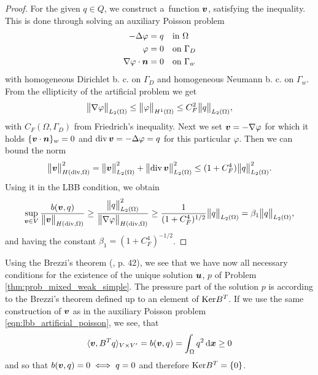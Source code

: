 \begin{proof}
For the given $q\in Q$, we construct a~function $\mathbf{\boldsymbol{v}}$, satisfying the inequality.
This is done through solving an auxiliary Poisson problem
\begin{equation} \label{eqn:lbb_artificial_poisson}  
\begin{aligned}
    -\Delta\varphi &= q && \textrm{in } \Omega\\
    \varphi &= 0 && \textrm{on } \Gamma_D \\
    \nabla\varphi\cdot\mathbf{\boldsymbol{n}} &= 0 && \textrm{on } \Gamma_w
\end{aligned}
\end{equation}
with homogeneous Dirichlet b. c. on $\Gamma_D$ and homogeneous Neumann b. c. on $\Gamma_w$.
From the ellipticity of the artificial problem we get
\begin{equation}
    \bigl\Vert\nabla\varphi\bigr\Vert_{L_2(\Omega)} \leq \bigl\Vert\varphi\bigr\Vert_{H^1(\Omega)}
        \leq C_F^2 \bigl\Vert q\bigr\Vert_{L_2(\Omega)},
\end{equation}
with $C_F(\Omega,\Gamma_D)$ from Friedrich's inequality.
Next we set $\mathbf{\boldsymbol{v}} = -\nabla \varphi$ for which it holds $\{\mathbf{\boldsymbol{v}}\cdot\mathbf{\boldsymbol{n}}\}_w=0$
and ${\rm div}\,\mathbf{\boldsymbol{v}} = -\Delta\varphi=q$ for this particular $\varphi$. Then we can bound the norm
\begin{equation}
    \bigl\Vert\mathbf{\boldsymbol{v}}\bigr\Vert^2_{H({\rm div},\Omega)} = \bigl\Vert\mathbf{\boldsymbol{v}}\bigr\Vert^2_{L_2(\Omega)} 
        + \bigl\Vert{\rm div}\,\mathbf{\boldsymbol{v}}\bigr\Vert^2_{L_2(\Omega)}
        \leq (1+C_F^4) \bigl\Vert q\bigr\Vert^2_{L_2(\Omega)}.
\end{equation}
Using it in the LBB condition, we obtain
\begin{equation} \label{eqn:form_b_lbb_proof}
    \sup_{\mathbf{\boldsymbol{v}}\in V} \frac{b(\mathbf{\boldsymbol{v}},q)}{\bigl\Vert\mathbf{\boldsymbol{v}}\bigr\Vert_{H({\rm div},\Omega)}} \geq
    \frac{\bigl\Vert q\bigr\Vert^2_{L_2(\Omega)}}{\bigl\Vert\nabla\varphi\bigr\Vert_{H({\rm div},\Omega)}}
    \geq \frac{1}{(1+C_F^4)^{1/2}} \bigl\Vert q\bigr\Vert_{L_2(\Omega)} = \beta_1 \bigl\Vert q\bigr\Vert_{L_2(\Omega)},
\end{equation}
and having the constant $\beta_1 = (1+C_F^4)^{-1/2}$.
\end{proof}

Using the Brezzi's theorem (\cite{brezzi_mixed_1991}, p. 42), we see that we have now
all necessary conditions for the existence of the unique solution $\mathbf{\boldsymbol{u}}$, $p$ of Problem \eqref{thm:prob_mixed_weak_simple}.
The pressure part of the solution $p$ is according to the Brezzi's theorem defined up to an element of $\textrm{Ker} B^T$.
If we use the same construction of $\mathbf{\boldsymbol{v}}$ as in the auxiliary Poisson problem \eqref{eqn:lbb_artificial_poisson},
we see, that
\[
    \langle \mathbf{\boldsymbol{v}}, B^T q \rangle_{V\times V'} = b(\mathbf{\boldsymbol{v}},q) = \int_\Omega q^2 \,{\rm d}\mathbf{\boldsymbol{x}} \geq 0
\]
and so that $b(\mathbf{\boldsymbol{v}},q) = 0 \iff q=0$ and therefore $\textrm{Ker} B^T=\{0\}$.

